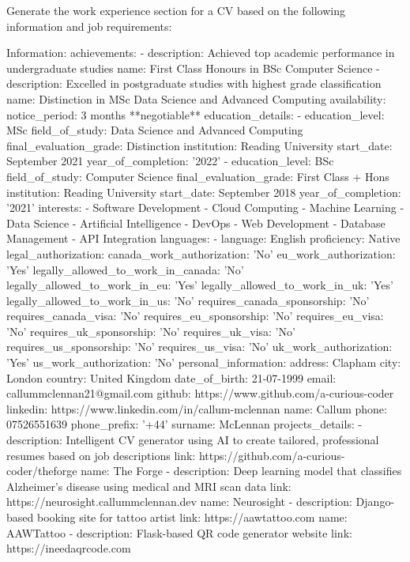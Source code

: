 
    Generate the work experience section for a CV based on the following information and job requirements:

    Information:
    achievements:
- description: Achieved top academic performance in undergraduate studies
  name: First Class Honours in BSc Computer Science
- description: Excelled in postgraduate studies with highest grade classification
  name: Distinction in MSc Data Science and Advanced Computing
availability:
  notice_period: 3 months **negotiable**
education_details:
- education_level: MSc
  field_of_study: Data Science and Advanced Computing
  final_evaluation_grade: Distinction
  institution: Reading University
  start_date: September 2021
  year_of_completion: '2022'
- education_level: BSc
  field_of_study: Computer Science
  final_evaluation_grade: First Class + Hons
  institution: Reading University
  start_date: September 2018
  year_of_completion: '2021'
interests:
- Software Development
- Cloud Computing
- Machine Learning
- Data Science
- Artificial Intelligence
- DevOps
- Web Development
- Database Management
- API Integration
languages:
- language: English
  proficiency: Native
legal_authorization:
  canada_work_authorization: 'No'
  eu_work_authorization: 'Yes'
  legally_allowed_to_work_in_canada: 'No'
  legally_allowed_to_work_in_eu: 'Yes'
  legally_allowed_to_work_in_uk: 'Yes'
  legally_allowed_to_work_in_us: 'No'
  requires_canada_sponsorship: 'No'
  requires_canada_visa: 'No'
  requires_eu_sponsorship: 'No'
  requires_eu_visa: 'No'
  requires_uk_sponsorship: 'No'
  requires_uk_visa: 'No'
  requires_us_sponsorship: 'No'
  requires_us_visa: 'No'
  uk_work_authorization: 'Yes'
  us_work_authorization: 'No'
personal_information:
  address: Clapham
  city: London
  country: United Kingdom
  date_of_birth: 21-07-1999
  email: callummclennan21@gmail.com
  github: https://www.github.com/a-curious-coder
  linkedin: https://www.linkedin.com/in/callum-mclennan
  name: Callum
  phone: 07526551639
  phone_prefix: '+44'
  surname: McLennan
projects_details:
- description: Intelligent CV generator using AI to create tailored, professional
    resumes based on job descriptions
  link: https://github.com/a-curious-coder/theforge
  name: The Forge
- description: Deep learning model that classifies Alzheimer's disease using medical
    and MRI scan data
  link: https://neurosight.callummclennan.dev
  name: Neurosight
- description: Django-based booking site for tattoo artist
  link: https://aawtattoo.com
  name: AAWTattoo
- description: Flask-based QR code generator website
  link: https://ineedaqrcode.com
